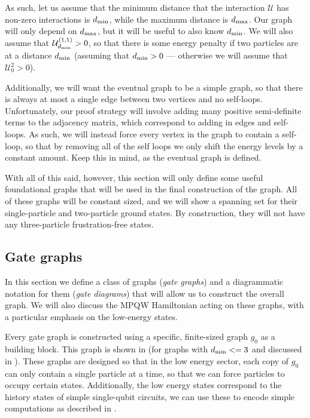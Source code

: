 \documentclass[../thesis-main/thesis-main]{subfiles}
\begin{document}
As such, let us assume that the minimum distance that the interaction $\mathcal{U}$ has non-zero interactions is $d_{\text{min}}$, while the maximum distance is $d_{\text{max}}$.  Our graph will only depend on $d_{\text{max}}$, but it will be useful to also know $d_{\text{min}}$.  We will also assume that $\mathcal{U}_{d_{\text{min}}}^{(1,1)} > 0$, so that there is some energy penalty if two particles are at a distance $d_{\text{min}}$ (assuming that $d_{\text{min}} > 0$ --- otherwise we will assume that $\mathcal{U}_0^{2} > 0$).

Additionally, we will want the eventual graph to be a simple graph, so that there is always at most a single edge between two vertices and no self-loops.  Unfortunately, our proof strategy will involve adding many positive semi-definite terms to the adjacency matrix, which correspond to adding in edges and self-loops.  As such, we will instead force every vertex in the graph to contain a self-loop, so that by removing all of the self loops we only shift the energy levels by a constant amount.  Keep this in mind, as the eventual graph is defined.

With all of this said, however, this section will only define some useful foundational graphs that will be used in the final construction of the graph.  All of these graphs will be constant sized, and we will show a spanning set for their single-particle and two-particle ground states.  By construction, they will not have any three-particle frustration-free states.

\subsection{Gate graphs}\label{sec:gate_graphs}


In this section we define a class of graphs (\emph{gate graphs}) and a diagrammatic notation for them (\emph{gate diagrams}) that will allow us to construct the overall graph. We will also discuss the MPQW Hamiltonian acting on these graphs, with a particular emphasis on the low-energy states.

Every gate graph is constructed using a specific, finite-sized graph $g_{0}$ as a building block. This graph is shown in  (for graphs with $d_{\text{min}} <= 3$ and discussed in ).  These graphs are designed so that in the low energy sector, each copy of $g_0$ can only contain a single particle at a time, so that we can force particles to occupy certain states.  Additionally, the low energy states correspond to the history states of simple single-qubit circuits, we can use these to encode simple computations as described in . 
\end{document}
